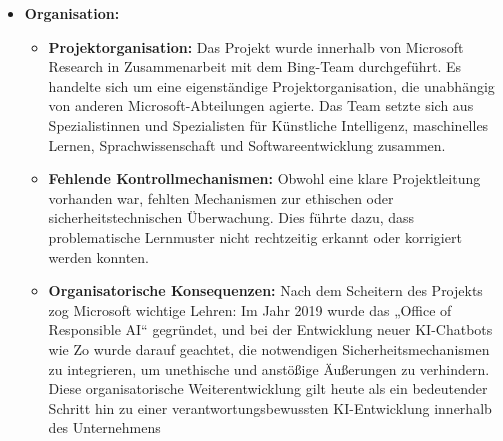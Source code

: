 \documentclass{article}
\begin{document}
\begin{itemize}
  \item \textbf{Organisation:}
  \begin{itemize}
    \item \textbf{Projektorganisation:} Das Projekt wurde innerhalb von Microsoft Research in Zusammenarbeit mit dem Bing-Team durchgeführt. 
    Es handelte sich um eine eigenständige Projektorganisation, die unabhängig von anderen Microsoft-Abteilungen agierte. 
    Das Team setzte sich aus Spezialistinnen und Spezialisten für Künstliche Intelligenz, maschinelles Lernen, Sprachwissenschaft und Softwareentwicklung zusammen.
    \item \textbf{Fehlende Kontrollmechanismen:} Obwohl eine klare Projektleitung vorhanden war, fehlten Mechanismen zur ethischen oder sicherheitstechnischen Überwachung. 
    Dies führte dazu, dass problematische Lernmuster nicht rechtzeitig erkannt oder korrigiert werden konnten.
    \item \textbf{Organisatorische Konsequenzen:} Nach dem Scheitern des Projekts zog Microsoft wichtige Lehren: Im Jahr 2019 wurde das „Office of Responsible AI“ gegründet, 
    und bei der Entwicklung neuer KI-Chatbots wie Zo wurde darauf geachtet, die notwendigen Sicherheitsmechanismen zu integrieren, um unethische und anstößige Äußerungen zu verhindern. 
    Diese organisatorische Weiterentwicklung gilt heute als ein bedeutender Schritt hin zu einer verantwortungsbewussten KI-Entwicklung innerhalb des Unternehmens
  \end{itemize}
  
  
  
  \end{itemize}
\end{document}
